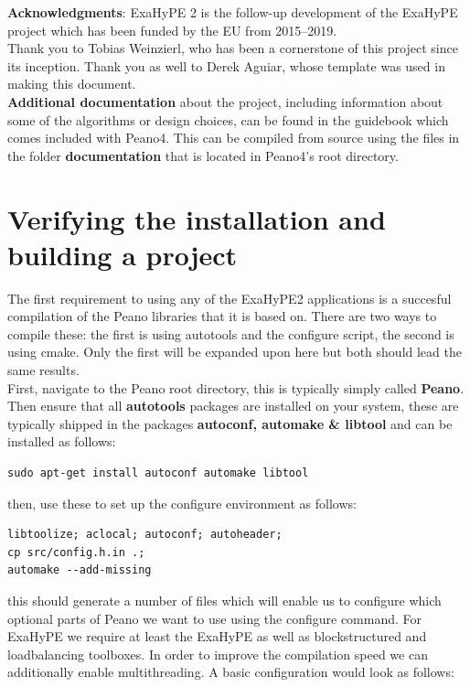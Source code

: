 \documentclass[12pt,letterpaper]{article}
\begin{document}
\textbf{Acknowledgments}:
ExaHyPE 2 is the follow-up development of the ExaHyPE project which has been funded
by the EU from 2015–2019.\\
Thank you to Tobias Weinzierl, who has been a cornerstone of this project since its inception. Thank you as well to Derek Aguiar, whose template was used in making this document. \\

\textbf{Additional documentation} about the project, including information about some of the algorithms or design choices, can be found in the guidebook which comes included with Peano4. This can be compiled from source using the files in the folder \textbf{documentation} that is located in Peano4's root directory.

\newpage


\section{Verifying the installation and building a project}
\label{Verifying_and_building}

The first requirement to using any of the ExaHyPE2 applications is a succesful compilation of the Peano libraries that it is based on. There are two ways to compile these: the first is using autotools and the configure script, the second is using cmake. Only the first will be expanded upon here but both should lead the same results.\\

First, navigate to the Peano root directory, this is typically simply called \textbf{Peano}. Then ensure that all \textbf{autotools} packages are installed on your system, these are typically shipped in the packages \textbf{autoconf, automake \& libtool} and can be installed as follows:\\

\begin{lstlisting}[style = Bash]
sudo apt-get install autoconf automake libtool
\end{lstlisting}

then, use these to set up the configure environment as follows:

\begin{lstlisting}[style = Bash]
libtoolize; aclocal; autoconf; autoheader;
cp src/config.h.in .;
automake --add-missing
\end{lstlisting}

this should generate a number of files which will enable us to configure which optional parts of Peano we want to use using the configure command. For ExaHyPE we require at least the ExaHyPE as well as blockstructured and loadbalancing toolboxes. In order to improve the compilation speed we can additionally enable multithreading. A basic configuration would look as follows:
\end{document}
